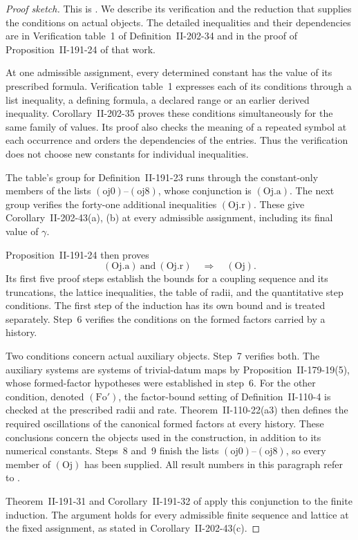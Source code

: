 \documentclass[11pt,letterpaper,reqno]{amsart}
\theoremstyle{definition}
\theoremstyle{remark}
\begin{document}
\begin{proof}[Proof sketch]
This is \cite[Corollary II-202-43]{gauge-notes}. We describe
its verification and the reduction that supplies the conditions
on actual objects. The detailed inequalities and their
dependencies are in Verification table~1 of Definition~II-202-34
and in the proof of Proposition~II-191-24 of that work.

At one admissible assignment, every determined constant has
the value of its prescribed formula. Verification table~1
expresses each of its conditions through a list inequality,
a defining formula, a declared range or an earlier derived
inequality. Corollary~II-202-35 proves these conditions
simultaneously for the same family of values. Its proof also
checks the meaning of a repeated symbol at each occurrence
and orders the dependencies of the entries. Thus the
verification does not choose new constants for individual
inequalities.

The table's group for Definition~II-191-23 runs through the
constant-only members of the lists
$(\mathrm{oj}0)$--$(\mathrm{oj}8)$, whose conjunction is
$(\mathrm{Oj.a})$. The next group verifies the forty-one
additional inequalities $(\mathrm{Oj.r})$. These give
Corollary~II-202-43(a), (b) at every admissible assignment,
including its final value of $\gamma$.

Proposition~II-191-24 then proves
\[
 (\mathrm{Oj.a})\ \text{and}\ (\mathrm{Oj.r})
             \quad\Longrightarrow\quad(\mathrm{Oj}).
\]
Its first five proof steps establish the bounds for a coupling
sequence and its truncations, the lattice inequalities, the
table of radii, and the quantitative step conditions. The
first step of the induction has its own bound and is treated
separately. Step~6 verifies the conditions on the formed
factors carried by a history.

Two conditions concern actual auxiliary objects. Step~7
verifies both. The auxiliary systems are systems of
trivial-datum maps by Proposition~II-179-19(5), whose
formed-factor hypotheses were established in step~6.
For the other condition, denoted $(\mathrm{Fo}')$, the
factor-bound setting of Definition~II-110-4 is checked at
the prescribed radii and rate. Theorem~II-110-22(a3) then
defines the required oscillations of the canonical formed
factors at every history. These conclusions concern the
objects used in the construction, in addition to its
numerical constants. Steps~8 and~9 finish the lists
$(\mathrm{oj}0)$--$(\mathrm{oj}8)$, so every member of
$(\mathrm{Oj})$ has been supplied. All result numbers in
this paragraph refer to \cite{gauge-notes}.

Theorem~II-191-31 and Corollary~II-191-32 of
\cite{gauge-notes} apply this conjunction to the finite
induction. The argument holds for every admissible finite
sequence and lattice at the fixed assignment, as stated
in Corollary~II-202-43(c).
\end{proof}
\end{document}
